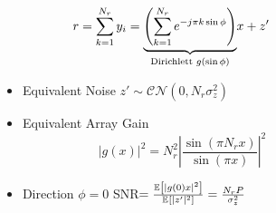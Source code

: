 \documentclass[xcolor=dvipsnames,aspectratio=169]{beamer}
\begin{document}
{\begin{columns}
\begin{column}{5cm}
 \end{column}
 \begin{column}{7cm}
  $$r=\sum_{k=1}^{N_{r}} y_i=\underset{\textnormal{Dirichlett }g(\sin\phi)}{\underbrace{\left(\sum_{k=1}^{N_{r}} e^{-j\pi k \sin\phi}\right)}}x+z'$$
 \begin{itemize}
  \item Equivalent Noise $z'\sim\mathcal{CN}(0,N_{r}\sigma_{z}^2)$
  \item Equivalent Array Gain $$|g(x)|^2=N_{r}^2\left|\frac{\sin(\pi N_{r} x)}{\sin(\pi x)}\right|^2$$
  \item Direction $\phi=0$ SNR$=\frac{{\mathbb{E}_{}\left[|g(0)x|^2\right]}}{{\mathbb{E}_{}\left[|z'|^2\right]}}=\frac{N_{r}P}{\sigma_z^2}$
 \end{itemize}
 \end{column}
\end{columns}


}
\end{document}
